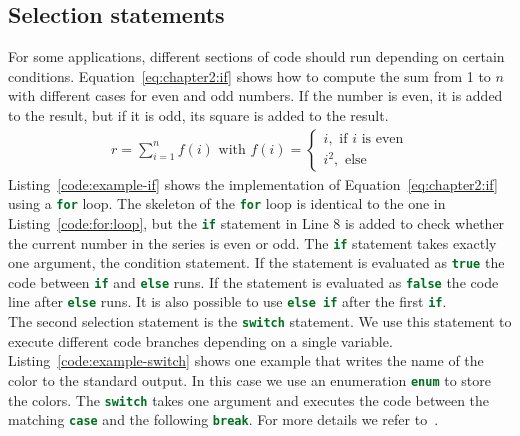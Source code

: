 \subsection{Selection statements}
For some applications, different sections of code should run depending on certain conditions. Equation~\ref{eq:chapter2:if} shows how to compute the sum from 1 to $n$ with different cases for even and odd numbers. If the number is even, it is added to the result, but if it is odd, its square is added to the result.
\begin{align}
r = \sum\limits_{i=1}^n f(i) \text{  with  } f(i) = 
\begin{cases}
i, \text{ if } i \text{ is even} \\
i^2, \text{ else}
\end{cases}
\label{eq:chapter2:if}
\end{align}
Listing~\ref{code:example-if} shows the implementation of Equation~\ref{eq:chapter2:if} using a \lstinline[language=c++]{for} loop. The skeleton of the \lstinline[language=c++]{for} loop is identical to the one in Listing~\ref{code:for:loop}, but the \lstinline[language=c++]{if} statement in Line 8 is added to check whether the current number in the series is even or odd. The \lstinline[language=c++]{if} statement takes exactly one argument, the condition statement. If the statement is evaluated as \lstinline[language=c++]{true} the code between \lstinline[language=c++]{if} and \lstinline[language=c++]{else} runs. If the statement is evaluated as \lstinline[language=c++]{false} the code line after \lstinline[language=c++]{else} runs. It is also possible to use \lstinline[language=c++]{else if} after the first \lstinline[language=c++]{if}. \\




The second selection statement is the \lstinline[language=c++]{switch} statement. We use this statement to execute different code branches depending on a single variable. Listing~\ref{code:example-switch} shows one example that writes the name of the color to the standard output. In this case we use an enumeration \lstinline[language=c++]{enum} to store the colors. The \lstinline[language=c++]{switch} takes one argument and executes the code between the matching \lstinline[language=c++]{case} and the following \lstinline[language=c++]{break}. For more details we refer to~\cite[Chapter~2]{andrew2000accelerated}.  


